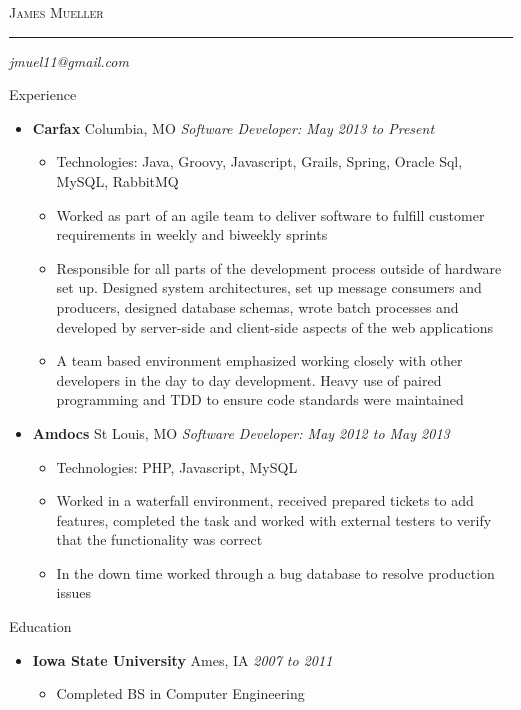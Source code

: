 \documentclass[11pt.oneside]{article}
\makeatletter
\newcommand{\name}{James Mueller}
\newcommand{\email}{jmuel11@gmail.com}
\newcommand{\bigname}[1]{
    \begin{center}\fontfamily{phv}\selectfont\Huge\scshape#1\end{center}
}
\newenvironment{ressection}[1]{
    \vspace{4pt}
    {\fontfamily{phv}\selectfont\Large#1}
    \begin{itemize}
    \vspace{3pt} 
}{
    \end{itemize}
}
\newcommand{\ressubitem}[1]{
    \vspace{-1pt}
    \item \begin{flushleft}#1 \end{flushleft}
}
\newcommand{\resbigitem}[3]{
    \vspace{-5pt}
    \item
    \textbf{#1}  #2 
    \hfill
    \textit{#3}
}
\newenvironment{ressubsec}[3]{
    \resbigitem{#1}{#2}{#3}
    \vspace{-2pt}
    \begin{itemize} 
}{
    \end{itemize}
}
\makeatother
\begin{document}
 \selectfont

\bigname{\name}

\vspace{-8pt}\rule{\textwidth}{1pt}

\begin{center}
    \small\itshape \email
\end{center}
\vspace{8 pt}


\begin{ressection}{Experience}
    \begin{ressubsec}{Carfax}{Columbia, MO}{Software Developer: May 2013 to Present}
        \ressubitem{Technologies: Java, Groovy, Javascript, Grails, Spring, Oracle Sql, MySQL, RabbitMQ}  
        \ressubitem{Worked as part of an agile team to deliver software to fulfill customer requirements in weekly and biweekly sprints}
        \ressubitem{Responsible for all parts of the development process outside of hardware set up. Designed system architectures, set up message consumers and producers, designed database schemas, wrote batch processes and developed by server-side and client-side aspects of the web applications}
        \ressubitem{A team based environment emphasized working closely with other developers in the day to day development. Heavy use of paired programming and TDD to ensure code standards were maintained}
    \end{ressubsec}
    \begin{ressubsec}{Amdocs}{St Louis, MO}{Software Developer: May 2012 to May 2013}
        \ressubitem{Technologies: PHP, Javascript, MySQL}
        \ressubitem{Worked in a waterfall environment, received prepared tickets to add features, completed the task and worked with external testers to verify that the functionality was correct}
        \ressubitem{In the down time worked through a bug database to resolve production issues}
    \end{ressubsec}
\end{ressection}

\begin{ressection}{Education}
    \begin{ressubsec}{Iowa State University}{Ames, IA}{2007 to 2011}
        \ressubitem{Completed BS in Computer Engineering}
    \end{ressubsec}
\end{ressection}
\end{document}
